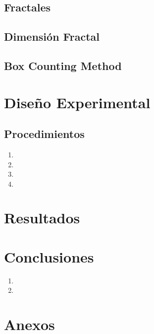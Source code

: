 \documentclass[conference]{IEEEtran}
\begin{document}
\subsection{Fractales}

\subsection{Dimensión Fractal}

\subsection{Box Counting Method}
    
    
\section{Diseño Experimental}

    \subsection{Procedimientos}
        \begin{enumerate}
            \item 
            \item 
            \item 
            \item 
        \end{enumerate}
        
        
        
\section{Resultados}
    
\section{Conclusiones}
\begin{enumerate}
    \item 
    \item 
\end{enumerate}

\section{Anexos}
    
\end{document}
